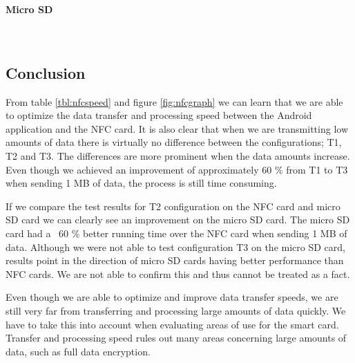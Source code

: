 \newpage
\paragraph{Micro SD}\mbox{}\\


\newpage
\subsection{Conclusion}
From table \ref{tbl:nfcspeed} and figure \ref{fig:nfcgraph} we can learn that we are able to optimize the data transfer and processing speed between the Android application and the NFC card. It is also clear that when we are transmitting low amounts of data there is virtually no difference between the configurations; T1, T2 and T3. The differences are more prominent when the data amounts increase. Even though we achieved an improvement of approximately 60 \% from T1 to T3 when sending 1 MB of data, the process is still time consuming.

If we compare the test results for T2 configuration on the NFC card and micro SD card we can clearly see an improvement on the micro SD card. The micro SD card had a ~60 \%  better running time over the NFC card when sending 1 MB of data. Although we were not able to test configuration T3 on the micro SD card, results point in the direction of micro SD cards having better performance than NFC cards. We are not able to confirm this and thus cannot be treated as a fact.

Even though we are able to optimize and improve data transfer speeds, we are still very far from transferring and processing large amounts of data quickly. We have to take this into account when evaluating areas of use for the smart card. Transfer and processing speed rules out many areas concerning large amounts of data, such as full data encryption.
